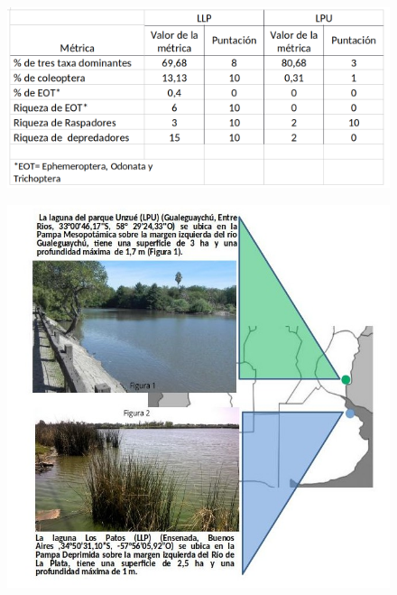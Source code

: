 \documentclass[final]{beamer}
\newlength{\onecolwid}
\begin{document}
\begin{frame}[t]
\begin{columns}[t]
         
         
         
         \begin{column}{\onecolwid} %
         
        
          
          \begin{block}{ }
				\begin{figure}
                	\vspace*{-1cm}
                    \includegraphics[width=.9\linewidth]{tabla.png}
				\end{figure}
				\begin{figure}
                  \includegraphics[width=.8\linewidth]{area_estudio.jpg}
				\end{figure}
                

\end{block}
\end{column}
\end{columns}
\end{frame}
\end{document}
